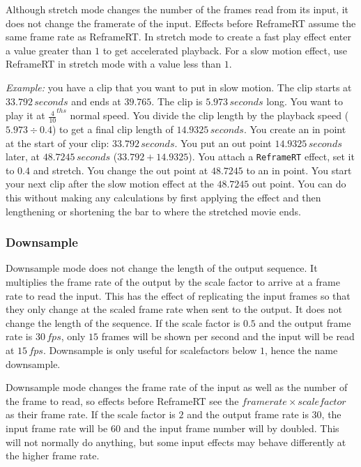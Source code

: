 Although stretch mode changes the number of the frames read from its
input, it does not change the framerate of the input. Effects before
ReframeRT assume the same frame rate as ReframeRT\@.  In stretch
mode to create a fast play effect enter a value greater than $1$ to
get accelerated playback.  For a slow motion effect, use ReframeRT
in stretch mode with a value less than $1$.

\textit{Example:} you have a clip that you want to put in slow motion. The clip starts at $33.792\, seconds$ and ends at $39.765$. The clip is $5.973\, seconds$ long. You want to play it at $\frac{4}{10}^{ths}$ normal speed. You divide the clip length by the playback speed ($5.973\div0.4$) to get a final clip length of $14.9325\,seconds$. You create an in point at the start of your clip: $33.792\,seconds$. You put an out point $14.9325\,seconds$ later, at $48.7245\,seconds$ ($33.792 + 14.9325$). You attach a \texttt{ReframeRT} effect, set it to $0.4$ and stretch. You change the out point at $48.7245$ to an in point. You start your next clip after the slow motion effect at the $48.7245$ out point. You can do this without making any calculations by first applying the effect and then lengthening or shortening the bar to where the stretched movie ends.

\subsubsection*{Downsample}%
\label{ssub:downsample}

Downsample mode does not change the length of the output sequence. It multiplies the frame rate of the output by the scale factor to arrive at a frame rate to read the input. This has the effect of replicating the input frames so that they only change at the scaled frame rate when sent to the output. It does not change the length of the sequence. If the scale factor is $0.5$ and the output frame rate is $30 \,fps$, only $15$ frames will be shown per second and the input will be read at $15 \,fps$. Downsample is only useful for scalefactors below $1$, hence the name downsample.

Downsample mode changes the frame rate of the input as well as the number of the frame to read, so effects before ReframeRT see the $frame rate \times scale factor$ as their frame rate. If the scale factor is $2$ and the output frame rate is $30$, the input frame rate will be $60$ and the input frame number will by doubled. This will not normally do anything, but some input effects may behave differently at the higher frame rate.

